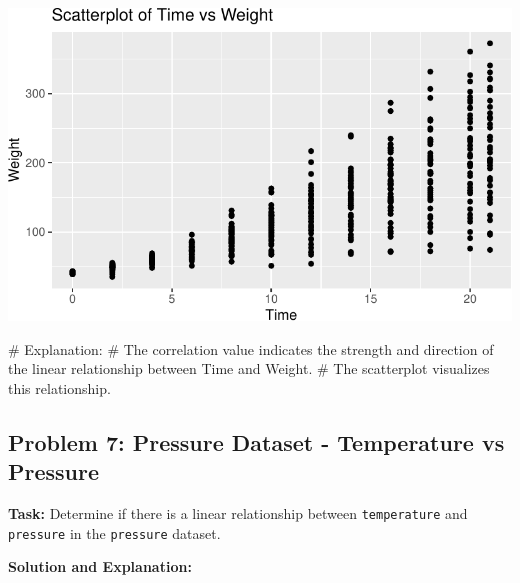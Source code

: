 \documentclass[
  letterpaper,
  DIV=11,
  numbers=noendperiod]{scrreprt}
\newenvironment{Shaded}{\begin{snugshade}}{\end{snugshade}}
\newcommand{\CommentTok}[1]{\textcolor[rgb]{0.37,0.37,0.37}{#1}}
\newcommand{\FunctionTok}[1]{\textcolor[rgb]{0.28,0.35,0.67}{#1}}
\newcommand{\NormalTok}[1]{\textcolor[rgb]{0.00,0.23,0.31}{#1}}
\newcommand{\OtherTok}[1]{\textcolor[rgb]{0.00,0.23,0.31}{#1}}
\newcommand{\SpecialCharTok}[1]{\textcolor[rgb]{0.37,0.37,0.37}{#1}}
\begin{document}
\includegraphics{Scatterplots_and_Correlation_files/figure-pdf/unnamed-chunk-11-1.pdf}

\begin{Shaded}
\begin{Highlighting}[]
\CommentTok{\# Explanation:}
\CommentTok{\# The correlation value indicates the strength and direction of the linear relationship between Time and Weight.}
\CommentTok{\# The scatterplot visualizes this relationship.}
\end{Highlighting}
\end{Shaded}

\subsection*{Problem 7: Pressure Dataset - Temperature vs
Pressure}\label{problem-7-pressure-dataset---temperature-vs-pressure}

\textbf{Task:} Determine if there is a linear relationship between
\texttt{temperature} and \texttt{pressure} in the \texttt{pressure}
dataset.

\textbf{Solution and Explanation:}

\begin{Shaded}
\end{Shaded}
\end{document}
